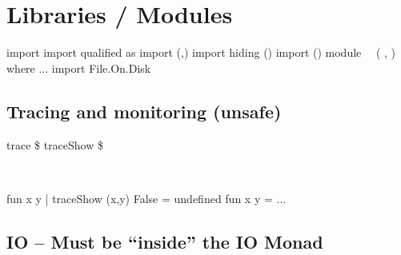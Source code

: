 \documentclass{refcard}
\begin{document}


\section{Libraries / Modules}

\begin{ldesc}
	\li[importing]               import 
	\li[~~(qualified)]           import qualified  as 
	\li[~~(subset)]              import  (,)
	\li[~~(hiding)]              import  hiding ()
	 import  ()
	\lI[declaring]
		module  \li
		~~( ,  ) \li
		where \li
	    ...
	 import File.On.Disk
\end{ldesc}


\subsection{Tracing and monitoring (unsafe) \hfill {}}

\begin{ldesc}
	 trace  \$ 
	     traceShow  \$ 
\end{ldesc} \\
\begin{ldesc}
	  fun x y | traceShow (x,y) False = undefined 
	                     fun x y = ...
\end{ldesc}


\subsection{IO \normalsize -- Must be ``inside'' the IO Monad}
\end{document}
